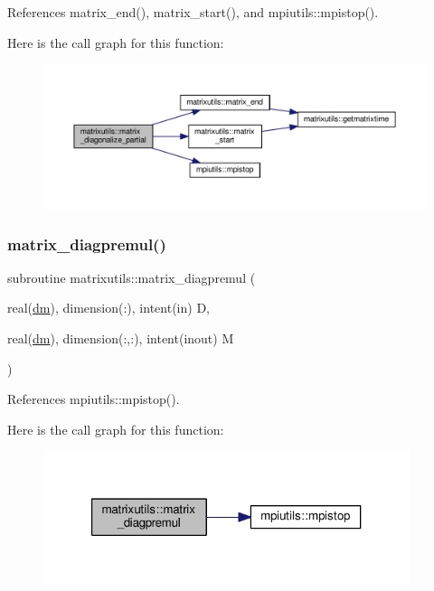 References matrix\+\_\+end(), matrix\+\_\+start(), and mpiutils\+::mpistop().

Here is the call graph for this function\+:
\nopagebreak
\begin{figure}[H]
\begin{center}
\leavevmode
\includegraphics[width=350pt]{namespacematrixutils_a1f7b4399f422b8532d242374454b9e03_cgraph}
\end{center}
\end{figure}
\mbox{\label{namespacematrixutils_ac24fa96b1159f9748d7f0ea3fbdc1199}} 
\subsubsection{\texorpdfstring{matrix\+\_\+diagpremul()}{matrix\_diagpremul()}}
{\footnotesize\ttfamily subroutine matrixutils\+::matrix\+\_\+diagpremul (\begin{DoxyParamCaption}\item[{real(\mbox{\hyperlink{namespacematrixutils_a7bdc564986ea4d90f51201c75606ef3d}{dm}}), dimension(\+:), intent(in)}]{D,  }\item[{real(\mbox{\hyperlink{namespacematrixutils_a7bdc564986ea4d90f51201c75606ef3d}{dm}}), dimension(\+:,\+:), intent(inout)}]{M }\end{DoxyParamCaption})}



References mpiutils\+::mpistop().

Here is the call graph for this function\+:
\nopagebreak
\begin{figure}[H]
\begin{center}
\leavevmode
\includegraphics[width=304pt]{namespacematrixutils_ac24fa96b1159f9748d7f0ea3fbdc1199_cgraph}
\end{center}
\end{figure}
\mbox{\label{namespacematrixutils_aeb25ca6b661aed4516c029f0cd6003bc}} 
